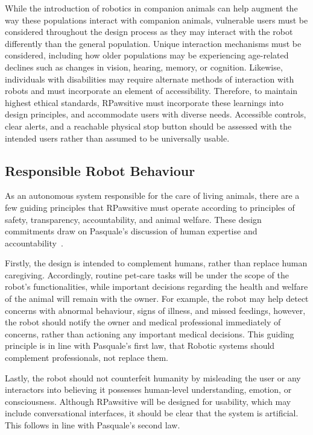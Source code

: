\documentclass[conference,letterpaper]{IEEEtran}
\begin{document}
While the introduction of robotics in companion animals can help augment the way these populations interact with companion animals, vulnerable users must be considered throughout the design process as they may interact with the robot differently than the general population. Unique interaction mechanisms must be considered, including how older populations may be experiencing age-related declines such as changes in vision, hearing, memory, or cognition. Likewise, individuals with disabilities may require alternate methods of interaction with robots and must incorporate an element of accessibility. Therefore, to maintain highest ethical standards, RPawsitive must incorporate these learnings into design principles, and accommodate users with diverse needs. Accessible controls, clear alerts, and a reachable physical stop button should be assessed with the intended users rather than assumed to be universally usable.

\subsection{Responsible Robot Behaviour}

As an autonomous system responsible for the care of living animals, there are a few guiding principles that RPawsitive must operate according to principles of safety, transparency, accountability, and animal welfare. These design commitments draw on Pasquale's discussion of human expertise and accountability~\cite{pasquale}.

Firstly, the design is intended to complement humans, rather than replace human caregiving. Accordingly, routine pet-care tasks will be under the scope of the robot’s functionalities, while important decisions regarding the health and welfare of the animal will remain with the owner. For example, the robot may help detect concerns with abnormal behaviour, signs of illness, and missed feedings, however, the robot should notify the owner and medical professional immediately of concerns, rather than actioning any important medical decisions. This guiding principle is in line with Pasquale’s first law, that Robotic systems should complement professionals, not replace them.

Lastly, the robot should not counterfeit humanity by misleading the user or any interactors into believing it possesses human-level understanding, emotion, or consciousness. Although RPawsitive will be designed for usability, which may include conversational interfaces, it should be clear that the system is artificial. This follows in line with Pasquale’s second law.
\end{document}
